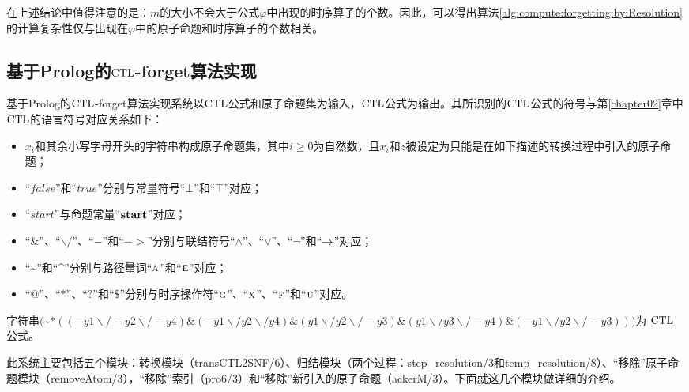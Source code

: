在上述结论中值得注意的是：$m$的大小不会大于公式$\varphi$中出现的时序算子的个数。因此，可以得出算法\ref{alg:compute:forgetting:by:Resolution}的计算复杂性仅与出现在$\varphi$中的原子命题和时序算子的个数相关。

\subsection{基于Prolog的$\textrm{CTL}$-forget算法实现}\label{cha5:subsec:prolog}
基于Prolog的$\textrm{CTL}$-forget算法实现系统以$\textrm{CTL}$公式和原子命题集为输入，$\textrm{CTL}$公式为输出。其所识别的$\textrm{CTL}$公式的符号与第\ref{chapter02}章中$\textrm{CTL}$的语言符号对应关系如下：
\begin{itemize}
	\item $x_i$和其余小写字母开头的字符串构成原子命题集，其中$i\geq 0$为自然数，且$x_i$和$z$被设定为只能是在如下描述的转换过程中引入的原子命题；%
	\item “$false$”和“$true$”分别与常量符号“$\bot$”和“$\top$”对应；
	\item “$start$”与命题常量“$\textbf{start}$”对应；
	\item “$\&$”、“$\backslash/$”、“$-$”和“$->$”分别与联结符号“$\wedge$”、“$\vee$”、“$\neg$”和“$\rightarrow$”对应；%
	\item “\textasciitilde”和“\textasciicircum”分别与路径量词“$\textsc{a}$”和“$\textsc{e}$”对应；
	\item “$@$”、“$*$”、“$?$”和“$\$$”分别与时序操作符“$\textsc{g}$”、“$\textsc{x}$”、“$\textsc{f}$”和“$\textsc{u}$”对应。
\end{itemize}
\begin{example}
	字符串$($\textasciitilde $* ((-y1\backslash/ -y2\backslash/ -y4)\& (-y1\backslash/y2\backslash/y4)\& (y1\backslash/y2\backslash/ -y3)\& (y1\backslash/y3\backslash/ -y4)\& (-y1\backslash/y2\backslash/ -y3)))$为 $\textrm{CTL}$ 公式。
\end{example}

此系统主要包括五个模块：转换模块（transCTL2SNF/6）、归结模块（两个过程：step\_resolution/3和temp\_resolution/8）、“移除”原子命题模块（removeAtom/3），“移除”索引（pro6/3）和“移除”新引入的原子命题（ackerM/3）。下面就这几个模块做详细的介绍。

